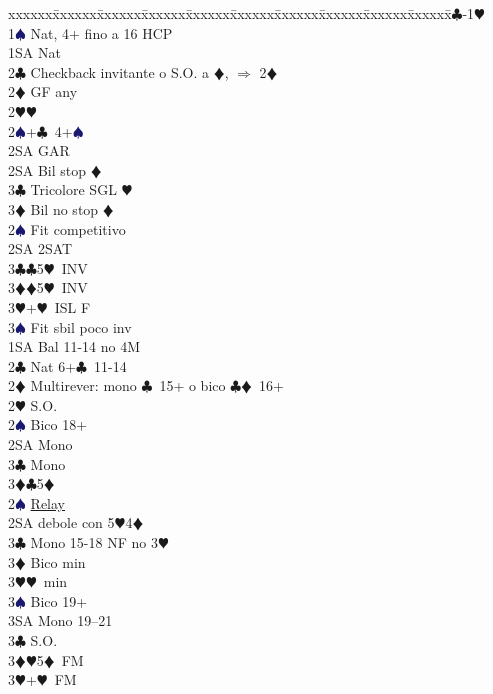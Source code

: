 \documentclass[a4paper,italian]{article}
\newcommand{\BC}{\textcolor{OliveGreen}{$\clubsuit$}}
\newcommand{\BD}{\textcolor{RedOrange}{$\vardiamondsuit$}}
\newcommand{\BH}{\textcolor{Red2}{$\varheartsuit${}}}
\newcommand{\BS}{\textcolor{MidnightBlue}{$\spadesuit${}}}
\newenvironment{bidtable}
{\begin{tabbing}

    xxxxxx\=xxxxxx\=xxxxxx\=xxxxxx\=xxxxxx\=xxxxxx\=xxxxxx\=xxxxxx\=xxxxxx\=xxxxxx\=\kill}
{\end{tabbing} }%
\begin{document}
\begin{multicols}{2}
    \begin{bidtable}
        1\BC-1\BH\+\\
        1\BS \> Nat, 4+ fino a 16 HCP\+\\
        1SA \> Nat\\
        2\BC \> Checkback invitante o S.O. a \BD , $\Rightarrow$ 2\BD \\
        2\BD \> GF any\+\\
        2\BH {}\BH \\
        2\BS {}+\BC\ 4+\BS \+\\
        2SA \> GAR\-\\
        2SA \> Bil stop \BD \\
        3\BC \> Tricolore SGL \BH \\
        3\BD \> Bil no stop \BD \-\\
        [2pt]2\BS \> Fit competitivo\\
        2SA \> 2SAT\\
        3\BC {}\BC 5\BH\ INV\\
        3\BD {}\BD 5\BH\ INV\\
        3\BH {}+\BH\ ISL F\\
        3\BS \> Fit sbil poco inv\-\\
        1SA \> Bal 11-14 no 4M\\
        2\BC \> Nat 6+\BC\ 11-14\\
        2\BD \> Multirever: mono \BC\ 15+ o bico \BC \BD\ 16+\+\\
        2\BH \> S.O.\+\\
        2\BS \> Bico 18+\\
        2SA\> Mono\\
        3\BC \> Mono\\
        3\BD {}\BC 5\BD \-\\
        2\BS \> \hyperref[multirever]{Relay}\\
        2SA \> debole con 5\BH 4\BD \+\\
        3\BC \> Mono 15-18 NF no 3\BH\\
        3\BD \> Bico min\\
        3\BH {}\BH\ min\\
        3\BS \> Bico 19+\\
        3SA \> Mono 19--21\-\\
        3\BC \> S.O.\\
        3\BD {}\BH 5\BD\ FM\\
        3\BH {}+\BH\ FM\+\\

\end{bidtable}
\end{multicols}
\end{document}
